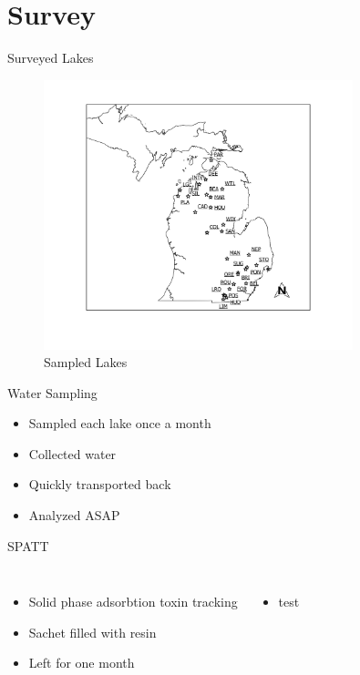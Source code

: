 \section{Survey}
\begin{frame}{Surveyed Lakes}

\begin{figure}
	\centering
	\includegraphics[width=0.8\textwidth,height=\textheight]{../figures/Overview.png}
	\caption{Sampled Lakes}
\end{figure}

\end{frame}

\begin{frame}{Water Sampling}

	\begin{itemize}
		\item Sampled each lake once a month
		\item Collected water
		\item Quickly transported back
		\item Analyzed ASAP
	\end{itemize}

\end{frame}

\begin{frame}{SPATT}

\begin{columns}
	\begin{itemize}
		\item Solid phase adsorbtion toxin tracking
		\item Sachet filled with resin
		\item Left for one month
	\end{itemize}


	\begin{itemize}
		\item test
	\end{itemize}
\end{columns}

\end{frame}

